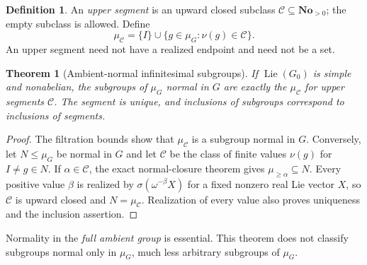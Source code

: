 \documentclass[11pt,letterpaper]{article}
\numberwithin{equation}{section}
\newtheorem{theorem}{Theorem}[section]
\theoremstyle{definition}
\newtheorem{definition}[definition]{Definition}
\theoremstyle{remark}
\newcommand{\No}{\mathbf{No}}
\newcommand{\Lie}{\operatorname{Lie}}
\begin{document}
\begin{definition}\label{e3:cpt:def:segment}
An \emph{upper segment} is an upward closed subclass $\mathcal C\subseteq\No_{>0}$;
the empty subclass is allowed. Define
\[
 \mu_{\mathcal C}=\{I\}\cup\{g\in\mu_G:\nu(g)\in\mathcal C\}.
\]
An upper segment need not have a realized endpoint and need not be a set.
\end{definition}

\begin{theorem}[Ambient-normal infinitesimal subgroups]\label{e3:cpt:thm:cuts}
If $\Lie(G_0)$ is simple and nonabelian, the subgroups of $\mu_G$ normal in $G$
are exactly the $\mu_{\mathcal C}$ for upper segments $\mathcal C$. The segment
is unique, and inclusions of subgroups correspond to inclusions of segments.
\end{theorem}
\begin{proof}
The filtration bounds show that $\mu_{\mathcal C}$ is a subgroup normal in $G$.
Conversely, let $N\le\mu_G$ be normal in $G$ and let $\mathcal C$ be the class
of finite values $\nu(g)$ for $I\ne g\in N$. If $\alpha\in\mathcal C$, the
exact normal-closure theorem gives $\mu_{\ge\alpha}\subseteq N$. Every positive
value $\beta$ is realized by $\sigma(\omega^{-\beta}X)$ for a fixed nonzero real
Lie vector $X$, so $\mathcal C$ is upward closed and $N=\mu_{\mathcal C}$.
Realization of every value also proves uniqueness and the inclusion assertion.
\end{proof}

Normality in the \emph{full ambient group} is essential. This theorem does not
classify subgroups normal only in $\mu_G$, much less arbitrary subgroups of
$\mu_G$.
\end{document}
